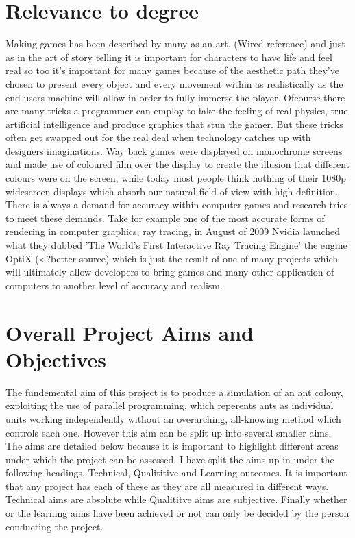 \documentclass{report}
\begin{document}
\section{Relevance to degree}
Making games has been described by many as an art, (Wired reference) and just as in the art of story telling it is important for characters to have life and feel real so too it's important for many games because of the aesthetic path they've chosen to present every object and every movement within as realistically as the end users machine will allow in order to fully immerse the player. Ofcourse there are many tricks a programmer can employ to fake the feeling of real physics, true artificial intelligence and produce graphics that stun the gamer. But these tricks often get swapped out for the real deal when technology catches up with designers imaginations. Way back games were displayed on monochrome screens and made use of coloured film over the display to create the illusion that different colours were on the screen, while today most people think nothing of their 1080p widescreen displays which absorb our natural field of view with high definition. There is always a demand for accuracy within computer games and research tries to meet these demands. Take for example one of the most accurate forms of rendering in computer graphics, ray tracing, in August of 2009 Nvidia launched what they dubbed 'The World's First Interactive Ray Tracing Engine' the engine OptiX (<?better source) which is just the result of one of many projects which will ultimately allow developers to bring games and many other application of computers to another level of accuracy and realism.

\section {Overall Project Aims and Objectives}
The fundemental aim of this project is to produce a simulation of an ant colony, exploiting the use of parallel programming, which reperents ants as individual units working independently without an overarching, all-knowing method which controls each one. However this aim can be split up into several smaller aims. The aims are detailed below because it is important to highlight different areas under which the project can be assessed. I have split the aims up in under the following headings, Technical, Qualititive and Learning outcomes. It is important that any project has each of these as they are all measured in different ways. Technical aims are absolute while Qualititve aims are subjective. Finally whether or the learning aims have been achieved or not can only be decided by the person conducting the project.
\end{document}
